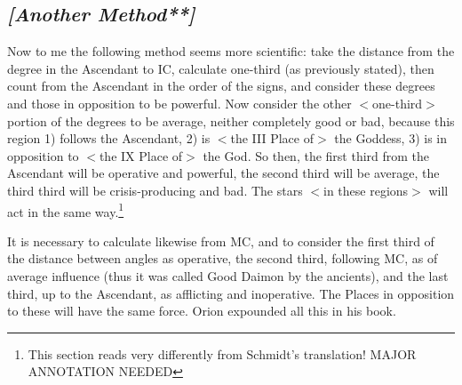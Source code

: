 \subsection{\textit{[Another Method**]}}
Now to me the following method seems more scientific: take the distance from the degree in the Ascendant to IC, calculate one-third (as previously stated), then count from the Ascendant in the order of the signs, and consider these degrees and those in opposition to be powerful. Now consider the other $<$one-third$>$ portion of the degrees to be average, neither completely good or bad, because this region 1) follows the Ascendant, 2) is $<$the III Place of$>$ the Goddess, 3) is in opposition to $<$the IX Place of$>$ the God. So then, the first third from the Ascendant will be operative and powerful, the second third will be average, the third third will be crisis-producing and bad. The stars $<$in these regions$>$ will act in the same way.\footnote{This section reads very differently from Schmidt's translation! MAJOR ANNOTATION NEEDED}

It is necessary to calculate likewise from MC, and to consider the first third of the distance between angles as operative, the second third, following MC, as of average influence (thus it was called Good Daimon by the ancients), and the last third, up to the Ascendant, as afflicting and inoperative. The Places
in opposition to these will have the same force. Orion expounded all this in his book.

\newpage